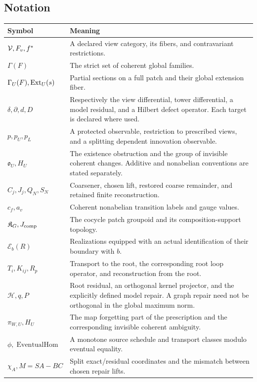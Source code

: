 \label{app:concordance}
\subsection{Notation}
\begin{longtable}{@{}p{.25\linewidth}p{.7\linewidth}@{}}
\toprule
Symbol & Meaning\\\midrule\endhead
\(\mathcal V,F_v,f^*\) & A declared view category, its fibers, and contravariant restrictions.\\
\(\Gamma(F)\) & The strict set of coherent global families.\\
\(\Gamma_U(F),\operatorname{Ext}_U(s)\) & Partial sections on a full patch and their global extension fiber.\\
\(\delta,\partial,d,D\) & Respectively the view differential, tower differential, a model residual, and a Hilbert defect operator. Each target is declared where used.\\
\(p,p_U,p_L\) & A protected observable, restriction to prescribed views, and a splitting dependent innovation observable.\\
\(\mathfrak o_U,H_U\) & The existence obstruction and the group of invisible coherent changes. Additive and nonabelian conventions are stated separately.\\
\(C_j,J_j,Q_N,S_N\) & Coarsener, chosen lift, restored coarse remainder, and retained finite reconstruction.\\
\(c_f,a_v\) & Coherent nonabelian transition labels and gauge values.\\
\(\mathfrak K_G,J_{\rm comp}\) & The cocycle patch groupoid and its composition-support topology.\\
\(\mathcal E_b(R)\) & Realizations equipped with an actual identification of their boundary with \(b\).\\
\(T_i,K_{ij},R_p\) & Transport to the root, the corresponding root loop operator, and reconstruction from the root.\\
\(\mathcal H,q,P\) & Root residual, an orthogonal kernel projector, and the explicitly defined model repair. A graph repair need not be orthogonal in the global maximum norm.\\
\(\pi_{W,U},H_U\) & The map forgetting part of the prescription and the corresponding invisible coherent ambiguity.\\
\(\phi,\operatorname{EventualHom}\) & A monotone source schedule and transport classes modulo eventual equality.\\
\(\chi_A,M=SA-BC\) & Split exact/residual coordinates and the mismatch between chosen repair lifts.\\

\end{longtable}
